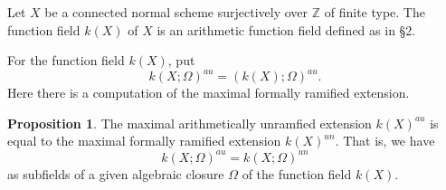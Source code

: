 \documentclass{amsart}
\theoremstyle{definition}
\newtheorem{proposition}[theorem]{Proposition}
\numberwithin{equation}{section}
\begin{document}
Let $X$ be a connected normal scheme surjectively over $\mathbb{Z}$ of finite type. The function field $k(X)$ of $X$ is an arithmetic function field defined as in \S 2.

For the function field $k(X)$, put $$k(X;\Omega)^{au}=(k(X);\Omega)^{au}.$$ Here there is a computation of the maximal formally
ramified extension.

\begin{proposition}
The maximal arithmetically
unramfied extension $k(X)^{au}$ is equal to the maximal formally ramified
extension $k(X)^{un}$.  That is, we have
\begin{equation*}
k(X;\Omega)^{au}= k(X;\Omega)^{un}
\end{equation*}
as subfields of a given algebraic closure $\Omega$ of the function field $k(X)$.
\end{proposition}
\end{document}

